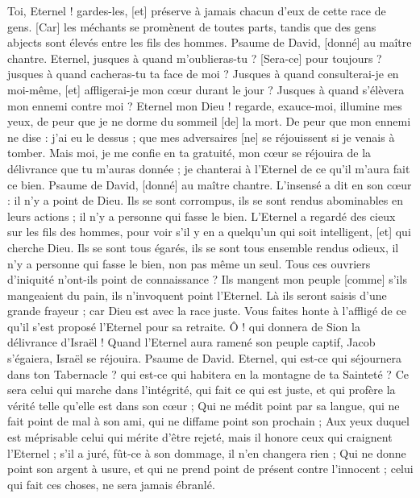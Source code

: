 \begin{multicols}{2}
Toi, Eternel ! gardes-les, [et] préserve à jamais chacun d'eux de cette race de gens.
[Car] les méchants se promènent de toutes parts, tandis que des gens abjects sont élevés entre les fils des hommes.
\VerseOne{}Psaume de David, [donné] au maître chantre. Eternel, jusques à quand m'oublieras-tu ? [Sera-ce] pour toujours ? jusques à quand cacheras-tu ta face de moi ?
Jusques à quand consulterai-je en moi-même, [et] affligerai-je mon cœur durant le jour ? Jusques à quand s'élèvera mon ennemi contre moi ?
Eternel mon Dieu ! regarde, exauce-moi, illumine mes yeux, de peur que je ne dorme du sommeil [de] la mort.
De peur que mon ennemi ne dise : j'ai eu le dessus ; que mes adversaires [ne] se réjouissent si je venais à tomber.
Mais moi, je me confie en ta gratuité, mon cœur se réjouira de la délivrance que tu m'auras donnée ; je chanterai à l'Eternel de ce qu'il m'aura fait ce bien.
\VerseOne{}Psaume de David, [donné] au maître chantre. L'insensé a dit en son cœur : il n'y a point de Dieu. Ils se sont corrompus, ils se sont rendus abominables en leurs actions ; il n'y a personne qui fasse le bien.
L'Eternel a regardé des cieux sur les fils des hommes, pour voir s'il y en a quelqu'un qui soit intelligent, [et] qui cherche Dieu.
Ils se sont tous égarés, ils se sont tous ensemble rendus odieux, il n'y a personne qui fasse le bien, non pas même un seul.
Tous ces ouvriers d'iniquité n'ont-ils point de connaissance ? Ils mangent mon peuple [comme] s'ils mangeaient du pain, ils n'invoquent point l'Eternel.
Là ils seront saisis d'une grande frayeur ; car Dieu est avec la race juste.
Vous faites honte à l'affligé de ce qu'il s'est proposé l'Eternel pour sa retraite.
Ô ! qui donnera de Sion la délivrance d'Israël ! Quand l'Eternel aura ramené son peuple captif, Jacob s'égaiera, Israël se réjouira.
\VerseOne{}Psaume de David. Eternel, qui est-ce qui séjournera dans ton Tabernacle ? qui est-ce qui habitera en la montagne de ta Sainteté ?
Ce sera celui qui marche dans l'intégrité, qui fait ce qui est juste, et qui profère la vérité telle qu'elle est dans son cœur ;
Qui ne médit point par sa langue, qui ne fait point de mal à son ami, qui ne diffame point son prochain ;
Aux yeux duquel est méprisable celui qui mérite d'être rejeté, mais il honore ceux qui craignent l'Eternel ; s'il a juré, fût-ce à son dommage, il n'en changera rien ;
Qui ne donne point son argent à usure, et qui ne prend point de présent contre l'innocent ; celui qui fait ces choses, ne sera jamais ébranlé.

\end{multicols}

